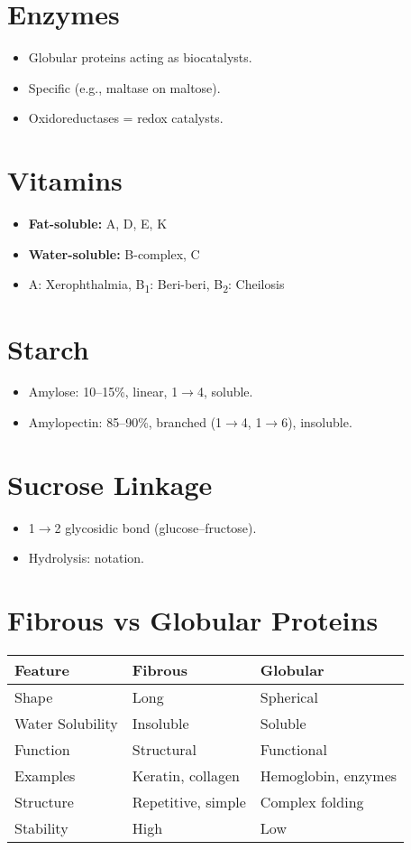\documentclass[12pt]{article}
\begin{document}
\section*{Enzymes}
\begin{itemize}
  \item Globular proteins acting as biocatalysts.
  \item Specific (e.g., maltase on maltose).
  \item Oxidoreductases = redox catalysts.
\end{itemize}

\section*{Vitamins}
\begin{itemize}
  \item \textbf{Fat-soluble:} A, D, E, K
  \item \textbf{Water-soluble:} B-complex, C
  \item A: Xerophthalmia, B\textsubscript{1}: Beri-beri, B\textsubscript{2}: Cheilosis
\end{itemize}

\section*{Starch}
\begin{itemize}
  \item Amylose: 10--15\%, linear, 1$\rightarrow$4, soluble.
  \item Amylopectin: 85--90\%, branched (1$\rightarrow$4, 1$\rightarrow$6), insoluble.
\end{itemize}

\section*{Sucrose Linkage}
\begin{itemize}
  \item 1$\rightarrow$2 glycosidic bond (glucose--fructose).
  \item Hydrolysis:  notation.
\end{itemize}

\section*{Fibrous vs Globular Proteins}

\begin{tabular}{@{}p{4cm}p{5cm}p{5cm}@{}}
\toprule
\textbf{Feature} & \textbf{Fibrous} & \textbf{Globular} \\
\midrule
Shape & Long & Spherical \\
Water Solubility & Insoluble & Soluble \\
Function & Structural & Functional \\
Examples & Keratin, collagen & Hemoglobin, enzymes \\
Structure & Repetitive, simple & Complex folding \\
Stability & High & Low \\
\bottomrule
\end{tabular}
\end{document}
